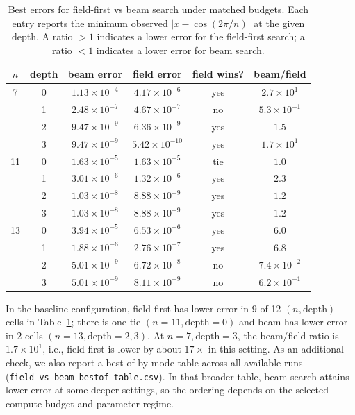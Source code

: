\documentclass[11pt]{article}
\begin{document}
\begin{table}[t]
  \centering
  \caption{Best errors for field-first vs beam search under matched budgets.
  Each entry reports the minimum observed $|x - \cos(2\pi/n)|$ at the given depth.
  A ratio $>1$ indicates a lower error for the field-first search; a ratio $<1$ indicates a lower error for beam search.}
  \label{tab:field-vs-beam}
  \begin{tabular}{cccccc}
    \toprule
    $n$ & depth & beam error & field error & field wins? & beam/field \\
    \midrule
    7 & 0 & $1.13{\times}10^{-4}$ & $4.17{\times}10^{-6}$ & yes  & $2.7{\times}10^{1}$ \\
      & 1 & $2.48{\times}10^{-7}$ & $4.67{\times}10^{-7}$ & no   & $5.3{\times}10^{-1}$ \\
      & 2 & $9.47{\times}10^{-9}$ & $6.36{\times}10^{-9}$ & yes  & $1.5$ \\
      & 3 & $9.47{\times}10^{-9}$ & $5.42{\times}10^{-10}$ & yes & $1.7{\times}10^{1}$ \\
    \midrule
    11 & 0 & $1.63{\times}10^{-5}$ & $1.63{\times}10^{-5}$ & tie & $1.0$ \\
       & 1 & $3.01{\times}10^{-6}$ & $1.32{\times}10^{-6}$ & yes & $2.3$ \\
       & 2 & $1.03{\times}10^{-8}$ & $8.88{\times}10^{-9}$ & yes & $1.2$ \\
       & 3 & $1.03{\times}10^{-8}$ & $8.88{\times}10^{-9}$ & yes & $1.2$ \\
    \midrule
    13 & 0 & $3.94{\times}10^{-5}$ & $6.53{\times}10^{-6}$ & yes & $6.0$ \\
       & 1 & $1.88{\times}10^{-6}$ & $2.76{\times}10^{-7}$ & yes & $6.8$ \\
       & 2 & $5.01{\times}10^{-9}$ & $6.72{\times}10^{-8}$ & no  & $7.4{\times}10^{-2}$ \\
       & 3 & $5.01{\times}10^{-9}$ & $8.11{\times}10^{-9}$ & no  & $6.2{\times}10^{-1}$ \\
    \bottomrule
  \end{tabular}
\end{table}

In the baseline configuration, field-first has lower error in 9 of 12 \((n,\text{depth})\) cells in Table~\ref{tab:field-vs-beam}; there is one tie \((n=11,\text{depth}=0)\) and beam has lower error in 2 cells \((n=13,\text{depth}=2,3)\).
At \(n=7,\text{depth}=3\), the beam/field ratio is \(1.7\times10^{1}\), i.e., field-first is lower by about \(17\times\) in this setting.
As an additional check, we also report a best-of-by-mode table across all available runs (\texttt{field\_vs\_beam\_bestof\_table.csv}).
In that broader table, beam search attains lower error at some deeper settings, so the ordering depends on the selected compute budget and parameter regime.
\end{document}
